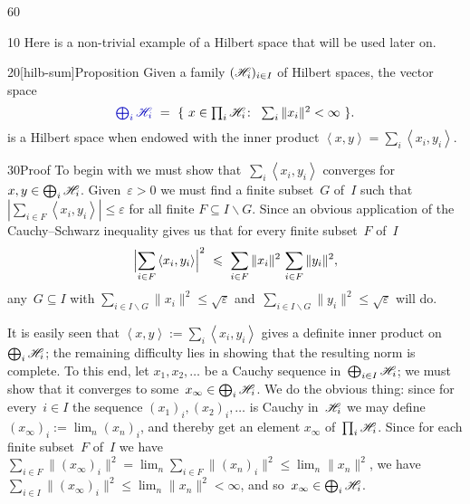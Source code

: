 \begin{parsec}{60}%
\begin{point}{10}%
Here is a non-trivial
example of a Hilbert space
that will be used later on.
\end{point}
\begin{point}{20}[hilb-sum]{Proposition}%
Given a family  $(\mathscr{H}_i)_{i\in I}$ 
of Hilbert spaces,
the vector space
\begin{equation*}
	\textstyle
	\Define{\bigoplus_i \scrH_i} \ =\ \{\ 
		x\in \prod_i \scrH_i\colon\ 
	\sum_i \|x_i\|^2 <\infty \ \}.
\end{equation*}%
%
is a Hilbert space
when endowed with the inner product
$\left<x,y\right>=\sum_i \left<x_i,y_i\right>$.
\begin{point}{30}{Proof}%
To begin with
we must show that~$\sum_i \left<x_i,y_i\right>$
converges for~$x,y\in\bigoplus_i \mathscr{H}_i$.
Given~$\varepsilon>0$
we must
find a finite subset~$G$ of~$I$
such that~$ \left|\sum_{i \in F} \left<x_i,y_i\right>\right|
\leq \varepsilon$ for all finite $F\subseteq I\backslash G$.
Since an obvious application
of the Cauchy--Schwarz inequality
gives
us that for every finite subset~$F$ of~$I$
\begin{equation*}
	\Bigl|\sum_{i\in F}
	\left<x_i,y_i\right>\Bigr|^2
	\ \leq\ 
	\sum_{i\in F}\|x_i\|^2
	\, \sum_{i\in F}\|y_i\|^2,
\end{equation*}
any~$G\subseteq I$
with $\sum_{i\in I\backslash G} \|x_i\|^2 \leq \sqrt{\varepsilon}$
	and~$\sum_{i\in I\backslash G} \|y_i\|^2 \leq \sqrt{\varepsilon}$
will do.

It is easily seen that
$\left<x,y\right>:=\sum_i \left<x_i,y_i\right>$
gives a definite inner product on~$\bigoplus_i \mathscr{H}_i$; the
remaining difficulty
lies in showing that the resulting norm is complete.
To this end, let $x_1,x_2,\dotsc$ be a Cauchy sequence 
in~$\bigoplus_{i\in I}\mathscr{H}_i$;
we must show that it converges to some~$x_\infty\in \bigoplus_i \mathscr{H}_i$.
We do the obvious thing:
since for every~$i\in I$
the sequence $(x_1)_i, (x_2)_i,\dotsc$
is Cauchy in~$\mathscr{H}_i$
we may define $(x_\infty)_i:=\lim_n (x_n)_i$,
and thereby get an element $x_\infty$ of~$\prod_i \mathscr{H}_i$.
Since for each finite subset~$F$ of~$I$
we have $\sum_{i\in F} \|(x_\infty)_i\|^2
=\lim_n \sum_{i\in F} \|(x_n)_i\|^2
\leq \lim_n \|x_n\|^2$,
we have $\sum_{i\in I} \|(x_\infty)_i\|^2 
\leq \lim_n \|x_n\|^2 <\infty$,
and so~$x_\infty\in\bigoplus_i \mathscr{H}_i$.


\end{point}
\end{point}
\end{parsec}
